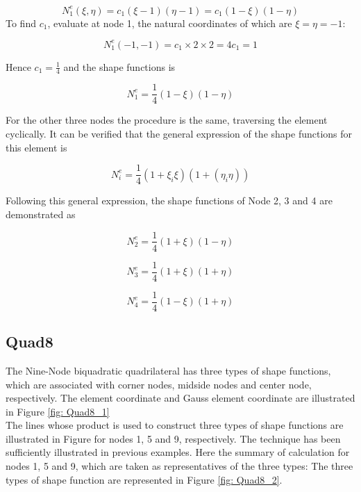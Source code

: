 \begin{equation}
N_1^e\left(\xi, \eta\right) = c_1 \left( \xi -1 \right) \left( \eta - 1\right) = c_1 \left(1 - \xi\right) \left( 1 - \eta \right)
\end{equation}
To find $c_1$, evaluate at node 1, the natural coordinates of which are $\xi = \eta = -1$:

\begin{equation}
N_1^e \left(-1, -1 \right) = c_1 \times 2 \times 2 = 4c_1 = 1
\end{equation}

Hence $c_1 = \frac{1}{4}$ and the shape functions is

\begin{equation}
N_1^e = \frac{1}{4} \left(1 - \xi\right) \left( 1 - \eta\right)
\end{equation}

For the other three nodes the procedure is the same, traversing the element cyclically. It can be verified that the general expression of the shape functions for this element is 

\begin{equation}
N_i^e = \frac{1}{4} \left( 1 + \xi_i \xi\right) \left(1 + \left(\eta_i \eta\right)\right)
\end{equation}

Following this general expression, the shape functions of Node 2, 3 and 4 are demonstrated as

\begin{equation}
N_2^e = \frac{1}{4} \left(1 + \xi\right) \left( 1 - \eta\right)
\end{equation}

\begin{equation}
N_3^e = \frac{1}{4} \left(1 + \xi\right) \left( 1 + \eta\right)
\end{equation}

\begin{equation}
N_4^e = \frac{1}{4} \left(1 - \xi\right) \left( 1 + \eta\right)
\end{equation}


\subsection{Quad8}

The Nine-Node biquadratic quadrilateral has three types of shape functions, which are associated with corner nodes, midside nodes and center node, respectively. The element coordinate and Gauss element coordinate are illustrated in Figure \ref{fig: Quad8_1} \\
The lines whose product is used to construct three types of shape functions are illustrated in Figure  for nodes 1, 5 and 9, respectively. The technique has been sufficiently illustrated in previous examples. Here the summary of calculation for nodes 1, 5 and 9, which are taken as representatives of the three types: The three types of shape function are represented in Figure \ref{fig: Quad8_2}.

